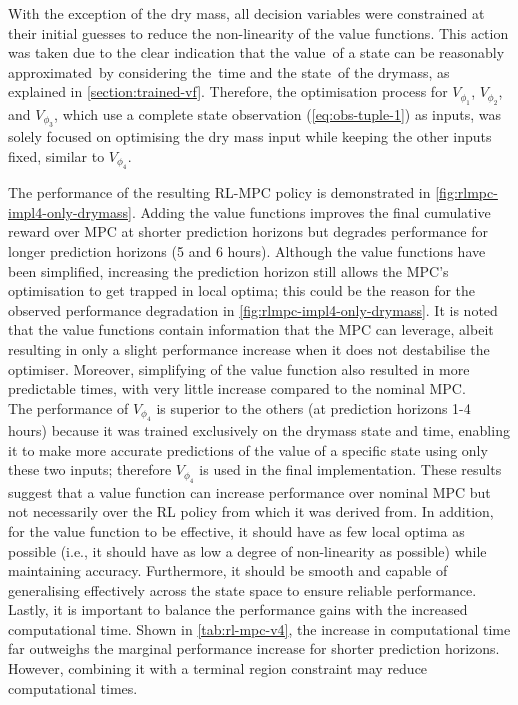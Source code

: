 With the exception of the dry mass, all decision variables were constrained at their initial guesses to reduce the non-linearity of the value functions. This action was taken due to the clear indication that the value of a state can be reasonably approximated by considering the time and the state of the drymass, as explained in \autoref{section:trained-vf}. Therefore, the optimisation process for ${V}_{\phi_1}$, ${V}_{\phi_2}$, and ${V}_{\phi_3}$, which use a complete state observation (\autoref{eq:obs-tuple-1}) as inputs, was solely focused on optimising the dry mass input while keeping the other inputs fixed, similar to ${V}_{\phi_4}$.

The performance of the resulting RL-MPC policy is demonstrated in \autoref{fig:rlmpc-impl4-only-drymass}. Adding the value functions improves the final cumulative reward over MPC at shorter prediction horizons but degrades performance for longer prediction horizons (5 and 6 hours). Although the value functions have been simplified, increasing the prediction horizon still allows the MPC's optimisation to get trapped in local optima; this could be the reason for the observed performance degradation in \autoref{fig:rlmpc-impl4-only-drymass}. It is noted that the value functions contain information that the MPC can leverage, albeit resulting in only a slight performance increase when it does not destabilise the optimiser. Moreover, simplifying of the value function also resulted in more predictable times, with very little increase compared to the nominal MPC.\\

The performance of ${V}_{\phi_4}$ is superior to the others (at prediction horizons 1-4 hours) because it was trained exclusively on the drymass state and time, enabling it to make more accurate predictions of the value of a specific state using only these two inputs; therefore ${V}_{\phi_4}$ is used in the final implementation. These results suggest that a value function can increase performance over nominal MPC but not necessarily over the RL policy from which it was derived from. In addition, for the value function to be effective, it should have as few local optima as possible (i.e., it should have as low a degree of non-linearity as possible) while maintaining accuracy. Furthermore, it should be smooth and capable of generalising effectively across the state space to ensure reliable performance. Lastly, it is important to balance the performance gains with the increased computational time. Shown in \autoref{tab:rl-mpc-v4}, the increase in computational time far outweighs the marginal performance increase for shorter prediction horizons. However, combining it with a terminal region constraint may reduce computational times.

